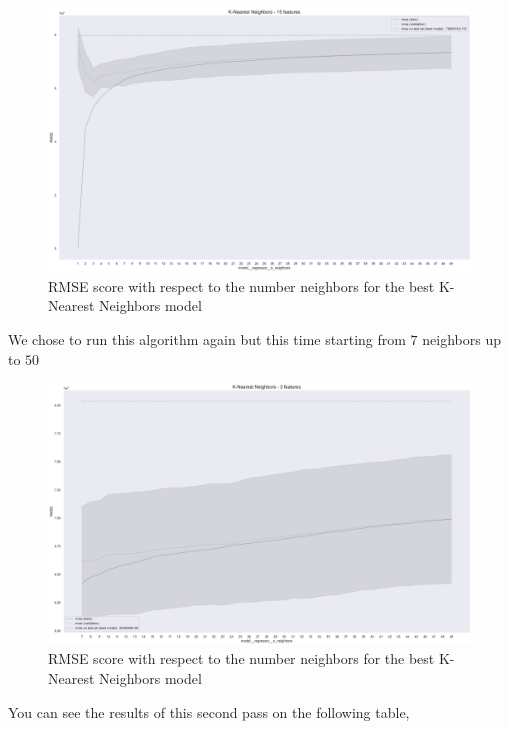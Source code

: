 \begin{figure}[H]
	\centering
	\includegraphics{figures/knn_eval1.pdf}
	\caption{RMSE score with respect to the number neighbors for the best K-Nearest Neighbors model}
	\label{fig:knn_eval1}
\end{figure}

We chose to run this algorithm again but this time starting from $7$ neighbors up to $50$

\begin{figure}[H]
	\centering
	\includegraphics{figures/knn_eval2.pdf}
	\caption{RMSE score with respect to the number neighbors for the best K-Nearest Neighbors model}
	\label{fig:knn_eval2}
\end{figure}

You can see the results of this second pass on the following table,

